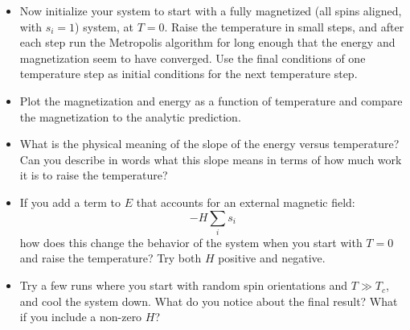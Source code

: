 \documentclass[11pt, preprint]{aastex}
\begin{document}
\begin{itemize}
\item Now initialize your system to start with a fully magnetized (all
  spins aligned, with $s_i = 1$) system, at $T=0$. Raise the
  temperature in small steps, and after each step run the Metropolis
  algorithm for long enough that the energy and magnetization seem to
  have converged. Use the final conditions of one temperature step as
  initial conditions for the next temperature step.
\item Plot the magnetization and energy as a function of temperature
  and compare the magnetization to the analytic prediction.
\item What is the physical meaning of the slope of the energy versus
  temperature?  Can you describe in words what this slope means in
  terms of how much work it is to raise the temperature?
\item If you add a term to $E$ that accounts for an external magnetic
  field:
  \begin{equation}
    -H \sum_i s_i
  \end{equation}
  how does this change the behavior of the system when you start with
  $T=0$ and raise the temperature?  Try both $H$ positive and
  negative.
\item Try a few runs where you start with random spin orientations and
  $T\gg T_c$, and cool the system down. What do you notice about the
  final result? What if you include a non-zero $H$?
\end{itemize}
\end{document}
